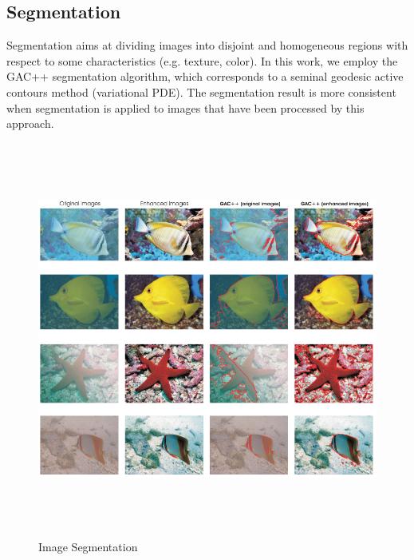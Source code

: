 \documentclass[hidelinks, 12pt]{report}
\begin{document}
\subsection{Segmentation}
Segmentation aims at dividing images into disjoint and homogeneous regions with respect to some characteristics (e.g. texture, color). In this work, we employ the GAC++ segmentation algorithm, which corresponds to a seminal geodesic active contours method (variational PDE). The segmentation result is more consistent when segmentation is applied to images that have been processed by this approach.
\begin{figure}[H]
\centering
\includegraphics[width=15cm,height=13cm]{Segment.png}
\caption[Image Segmentation]{Image Segmentation}
\label{Image Segmentation}
\end{figure}
\end{document}
